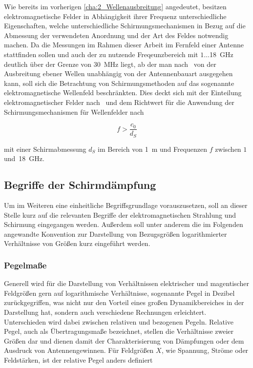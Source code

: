 Wie bereits im vorherigen \Abschnitt \ref{cha:2_Wellenausbreitung} angedeutet, besitzen elektromagnetische Felder in Abhängigkeit ihrer Frequenz unterschiedliche Eigenschaften, welche unterschiedliche Schirmungsmechanismen in Bezug auf die Abmessung der verwendeten Anordnung und der Art des Feldes notwendig machen. Da die Messungen im Rahmen dieser Arbeit im Fernfeld einer Antenne stattfinden sollen und auch der zu nutzende Freqeunzbereich mit $1\ldots$\SI{18}{\giga\hertz} deutlich über der Grenze von \SI{30}{\mega\hertz} liegt, ab der man nach~\cite{Design_of_shielded_enclosures} von der Ausbreitung ebener Wellen unabhängig von der Antennenbauart ausgegehen kann, soll sich die Betrachtung von Schirmungsmethoden auf das sogenannte elektromagnetische Wellenfeld beschränkten. Dies deckt sich mit der Einteilung elektromagnetischer Felder nach~\cite{Feldtheorie_Begriffe} und dem Richtwert für die Anwendung der Schirmungsmechanismen für Wellenfelder nach~\cite{EM_Schirmung}

\begin{equation}
    f > \frac{c_0}{d_S}
\end{equation}

mit einer Schirmabmessung $d_S$ im Bereich von \SI{1}{\meter} und Frequenzen $f$ zwischen $1$ und~\SI{18}{\giga\hertz}.




\subsection{Begriffe der Schirmdämpfung}\label{cha:2_sub_Begriff_der_Schirmdaempfung}

Um im Weiteren eine einheitliche Begriffsgrundlage vorauszusetzen, soll an dieser Stelle kurz auf die relevanten Begriffe der elektromagnetischen Strahlung und Schirmung eingegangen werden. Außerdem soll unter anderem die im Folgenden angewandte Konvention zur Darstellung von Bezugsgrößen logarithmierter Verhältnisse von Größen kurz eingeführt werden. 

\subsubsection{Pegelmaße}

Generell wird für die Darstellung von Verhältnissen elektrischer und magentischer Feldgrößen gern auf logarithmische Verhältnisse, sogenannte Pegel in Dezibel zurückgegriffen, was nicht nur den Vorteil eines großen Dynamikbereiches in der Darstellung hat, sondern auch verschiedene Rechnungen erleichtert. Unterschieden wird dabei zwischen relativen und bezogenen Pegeln. Relative Pegel, auch als Übertragungsmaße bezeichnet, stellen die Verhältnisse zweier Größen dar und dienen damit der Charakterisierung von Dämpfungen oder dem Ausdruck von Antennengewinnen. Für Feldgrößen $X$, wie Spannung, Ströme oder Feldstärken, ist der relative Pegel anders definiert~\cite{EM_Schirmung}

